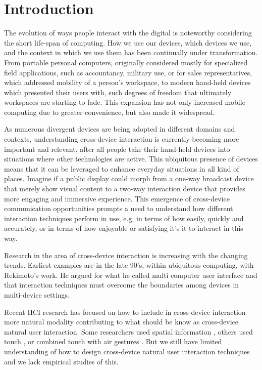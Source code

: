 \section{Introduction} \label{sec:introduction}
The evolution of ways people interact with the digital is noteworthy considering the short life-span of computing. How we use our devices, which devices we use, and the context in which we use them has been continually under transformation. From portable personal computers, originally considered mostly for specialized field applications, such as accountancy, military use, or for sales representatives, which addressed mobility of a person's workspace, to modern hand-held devices which presented their users with, such degrees of freedom that ultimately workspaces are starting to fade. This expansion has not only increased mobile computing due to greater convenience, but also made it widespread.\cite{Francis:1997}

As numerous divergent devices are being adopted in different domains and contexts, understanding cross-device interaction is currently becoming more important and relevant, after all people take their hand-held devices into situations where other technologies are active. This ubiquitous presence of devices means that it can be leveraged to enhance everyday situations in all kind of places. Imagine if a public display could morph from a one-way broadcast device that merely show visual content to a two-way interaction device that provides more engaging and immersive experience. This emergence of cross-device communication opportunities prompts a need to understand how different interaction techniques perform in use, e.g. in terms of how easily, quickly and accurately, or in terms of how enjoyable or satisfying it's it to interact in this way.

Research in the area of cross-device interaction is increasing with the changing trends. Earliest examples are in the late 90's, within ubiquitous computing, with Rekimoto's work.  He argued for what he called multi computer user interface and that interaction techniques must overcome the boundaries among devices in multi-device settings\cite{Rekimoto:1998}.

Recent HCI research has focused on how to include in cross-device interaction more natural modality contributing to what should be know as cross-device natural user interaction.  Some researchers used spatial information \cite{Marquardt:2011, Marquardt:2012}, others used touch \cite{Seifert:2012}, or combined touch with air gestures \cite{Bragdon:2011} . But we still have limited understanding of how to design cross-device natural user interaction techniques and we lack empirical studies of this.

